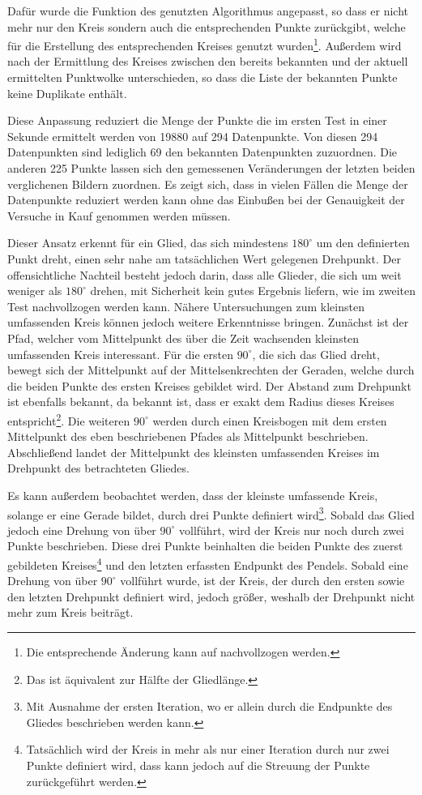 Dafür wurde die Funktion des genutzten Algorithmus angepasst, so dass er nicht mehr nur den Kreis sondern auch die entsprechenden Punkte zurückgibt, welche für die Erstellung des entsprechenden Kreises genutzt wurden\footnote{Die entsprechende Änderung kann auf  nachvollzogen werden.}.
Au{\ss}erdem wird nach der Ermittlung des Kreises zwischen den bereits bekannten und der aktuell ermittelten Punktwolke unterschieden, so dass die Liste der bekannten Punkte keine Duplikate enthält.

Diese Anpassung reduziert die Menge der Punkte die im ersten Test in einer Sekunde ermittelt werden von 19880 auf 294 Datenpunkte.
Von diesen 294 Datenpunkten sind lediglich 69 den bekannten Datenpunkten zuzuordnen.
Die anderen 225 Punkte lassen sich den gemessenen Veränderungen der letzten beiden verglichenen Bildern zuordnen.
Es zeigt sich, dass in vielen Fällen die Menge der Datenpunkte reduziert werden kann ohne das Einbu{\ss}en bei der Genauigkeit der Versuche in Kauf genommen werden müssen.

Dieser Ansatz erkennt für ein Glied, das sich mindestens $180^\circ$ um den definierten Punkt dreht, einen sehr nahe am tatsächlichen Wert gelegenen Drehpunkt.
Der offensichtliche Nachteil besteht jedoch darin, dass alle Glieder, die sich um weit weniger als $180^\circ$ drehen, mit Sicherheit kein gutes Ergebnis liefern, wie im zweiten Test nachvollzogen werden kann.
Nähere Untersuchungen zum kleinsten umfassenden Kreis können jedoch weitere Erkenntnisse bringen.
Zunächst ist der Pfad, welcher vom Mittelpunkt des über die Zeit wachsenden kleinsten umfassenden Kreis interessant.
Für die ersten $90^\circ$, die sich das Glied dreht, bewegt sich der Mittelpunkt auf der Mittelsenkrechten der Geraden, welche durch die beiden Punkte des ersten Kreises gebildet wird.
Der Abstand zum Drehpunkt ist ebenfalls bekannt, da bekannt ist, dass er exakt dem Radius dieses Kreises entspricht\footnote{Das ist äquivalent zur Hälfte der Gliedlänge.}.
Die weiteren $90^\circ$ werden durch einen Kreisbogen mit dem ersten Mittelpunkt des eben beschriebenen Pfades als Mittelpunkt beschrieben.
Abschlie{\ss}end landet der Mittelpunkt des kleinsten umfassenden Kreises im Drehpunkt des betrachteten Gliedes.

Es kann au{\ss}erdem beobachtet werden, dass der kleinste umfassende Kreis, solange er eine Gerade bildet, durch drei Punkte definiert wird\footnote{Mit Ausnahme der ersten Iteration, wo er allein durch die Endpunkte des Gliedes beschrieben werden kann.}.
Sobald das Glied jedoch eine Drehung von über $90^\circ$ vollführt, wird der Kreis nur noch durch zwei Punkte beschrieben.
Diese drei Punkte beinhalten die beiden Punkte des zuerst gebildeten Kreises\footnote{Tatsächlich wird der Kreis in mehr als nur einer Iteration durch nur zwei Punkte definiert wird, dass kann jedoch auf die Streuung der Punkte zurückgeführt werden.} und den letzten erfassten Endpunkt des Pendels.
Sobald eine Drehung von über $90^\circ$ vollführt wurde, ist der Kreis, der durch den ersten sowie den letzten Drehpunkt definiert wird, jedoch grö{\ss}er, weshalb der Drehpunkt nicht mehr zum Kreis beiträgt.


